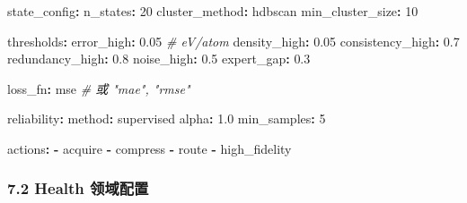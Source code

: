 \documentclass[
  12pt,
]{ctexart}
\newenvironment{Shaded}{}{}
\newcommand{\AttributeTok}[1]{\textcolor[rgb]{0.49,0.56,0.16}{#1}}
\newcommand{\CommentTok}[1]{\textcolor[rgb]{0.38,0.63,0.69}{\textit{#1}}}
\newcommand{\DecValTok}[1]{\textcolor[rgb]{0.25,0.63,0.44}{#1}}
\newcommand{\FloatTok}[1]{\textcolor[rgb]{0.25,0.63,0.44}{#1}}
\newcommand{\FunctionTok}[1]{\textcolor[rgb]{0.02,0.16,0.49}{#1}}
\newcommand{\KeywordTok}[1]{\textcolor[rgb]{0.00,0.44,0.13}{\textbf{#1}}}
\begin{document}
\begin{Shaded}
\begin{Highlighting}[]
\FunctionTok{state\_config}\KeywordTok{:}
\AttributeTok{  }\FunctionTok{n\_states}\KeywordTok{:}\AttributeTok{ }\DecValTok{20}
\AttributeTok{  }\FunctionTok{cluster\_method}\KeywordTok{:}\AttributeTok{ hdbscan}
\AttributeTok{  }\FunctionTok{min\_cluster\_size}\KeywordTok{:}\AttributeTok{ }\DecValTok{10}

\FunctionTok{thresholds}\KeywordTok{:}
\AttributeTok{  }\FunctionTok{error\_high}\KeywordTok{:}\AttributeTok{ }\FloatTok{0.05}\CommentTok{       \# eV/atom}
\AttributeTok{  }\FunctionTok{density\_high}\KeywordTok{:}\AttributeTok{ }\FloatTok{0.05}
\AttributeTok{  }\FunctionTok{consistency\_high}\KeywordTok{:}\AttributeTok{ }\FloatTok{0.7}
\AttributeTok{  }\FunctionTok{redundancy\_high}\KeywordTok{:}\AttributeTok{ }\FloatTok{0.8}
\AttributeTok{  }\FunctionTok{noise\_high}\KeywordTok{:}\AttributeTok{ }\FloatTok{0.5}
\AttributeTok{  }\FunctionTok{expert\_gap}\KeywordTok{:}\AttributeTok{ }\FloatTok{0.3}

\FunctionTok{loss\_fn}\KeywordTok{:}\AttributeTok{ mse}\CommentTok{              \# 或 "mae", "rmse"}

\FunctionTok{reliability}\KeywordTok{:}
\AttributeTok{  }\FunctionTok{method}\KeywordTok{:}\AttributeTok{ supervised}
\AttributeTok{  }\FunctionTok{alpha}\KeywordTok{:}\AttributeTok{ }\FloatTok{1.0}
\AttributeTok{  }\FunctionTok{min\_samples}\KeywordTok{:}\AttributeTok{ }\DecValTok{5}

\FunctionTok{actions}\KeywordTok{:}
\AttributeTok{  }\KeywordTok{{-}}\AttributeTok{ acquire}
\AttributeTok{  }\KeywordTok{{-}}\AttributeTok{ compress}
\AttributeTok{  }\KeywordTok{{-}}\AttributeTok{ route}
\AttributeTok{  }\KeywordTok{{-}}\AttributeTok{ high\_fidelity}
\end{Highlighting}
\end{Shaded}

\subsubsection{7.2 Health
领域配置}\label{health-ux9886ux57dfux914dux7f6e}
\end{document}
